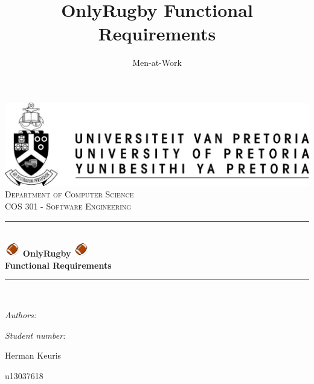 \documentclass[a4paper,12pt]{report}
\author{Men-at-Work}
\title{ OnlyRugby Functional Requirements}
\newcommand{\HRule}{\rule{\linewidth}{0.5mm}}
\begin{document}
\setlength{\parskip}{6pt}

\begin{titlepage}

\begin{center}
\includegraphics[width=1\textwidth]{./up-logo.jpg}\\[0.4cm]    
\textsc{\LARGE Department of Computer Science}\\[1.5cm]
\textsc{\Large COS 301 - Software Engineering}\\[0.5cm]
\HRule \\[0.4cm]
\includegraphics[width=0.05\textwidth]{./logo.png} 
{ \huge \bfseries OnlyRugby}
\includegraphics[width=0.05\textwidth]{./logo.png}\\[0.4cm] 
{ \huge \bfseries Functional Requirements}\\[0.4cm]
\HRule \\[0.4cm]
\begin{minipage}{0.4\textwidth}
\begin{flushleft} \large
\emph{Authors:}
\end{flushleft}
\end{minipage}
\begin{minipage}{0.4\textwidth}
\begin{flushright} \large
\emph{Student number:}
\end{flushright}
\end{minipage}

\begin{minipage}{0.4\textwidth}
\begin{flushleft} \large
Herman {Keuris}
\end{flushleft}
\end{minipage}
\begin{minipage}{0.4\textwidth}
\begin{flushright} \large
\emph{}
u13037618
\end{flushright}
\end{minipage}


\end{center}
\end{titlepage}
\end{document}
